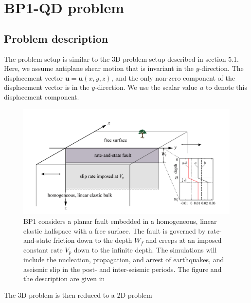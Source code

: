 \section{BP1-QD problem}
\subsection{Problem description}
The problem setup is similar to the 3D problem setup described in section 5.1. Here, we assume antiplane shear motion that is invariant in the $y$-direction.
The displacement vector $\textbf{u} = \textbf{u}(x,y,z)$, and the only non-zero component of the displacement vector is in the $y$-direction.
We use the scalar value $u$ to denote this displacement component.

\begin{figure}
    \centering
    \includegraphics[width=\linewidth]{figures/BP1-figure}
    \caption{BP1 considers a planar fault embedded in a homogeneous, linear elastic halfspace with a free surface. The fault is governed by rate-and-state friction down to the depth $W_f$ and creeps at an imposed constant rate $V_p$ down to the infinite depth. The simulations will include the nucleation, propagation, and arrest of earthquakes, and aseismic slip in the post- and inter-seismic periods. The figure and the description are given in \citep{erickson2018seas}}
    \label{fig:enter-label}
\end{figure}



The 3D problem is then reduced to a 2D problem

